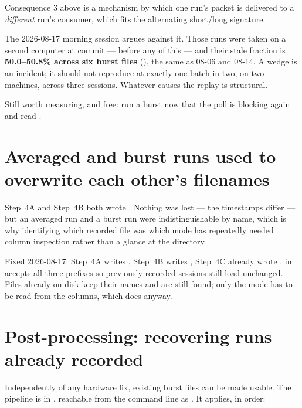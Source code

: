 \begin{openbox}[title=\textbf{Still open: does the wedge explain the burst replay? Probably not.}]
Consequence 3 above is a mechanism by which one run's packet is delivered to a
\emph{different} run's consumer, which fits the alternating short/long signature.

The 2026-08-17 morning session argues against it. Those runs were taken on a
second computer at commit  --- before any of this --- and their stale
fraction is \textbf{50.0--50.8\% across six burst files}
(), the same as 08-06 and 08-14. A wedge is an
incident; it should not reproduce at exactly one batch in two, on two machines,
across three sessions. Whatever causes the replay is structural.

Still worth measuring, and free: run a burst now that the poll is blocking again
and read .
\end{openbox}

\section{Averaged and burst runs used to overwrite each other's filenames}
\label{sec:namecollision}

Step~4A and Step~4B both wrote . Nothing was
lost --- the timestamps differ --- but an averaged run and a burst run were
indistinguishable by name, which is why identifying which recorded file was which
mode has repeatedly needed column inspection rather than a glance at the directory.

Fixed 2026-08-17: Step~4A writes , Step~4B writes
, Step~4C already wrote .
 in  accepts all three
prefixes so previously recorded sessions still load unchanged. Files already on disk
keep their  names and are still found; only the mode has to be read from
the columns, which  does anyway.


\section{Post-processing: recovering runs already recorded}
\label{sec:postproc}

Independently of any hardware fix, existing burst files can be made usable. The
pipeline is  in , reachable from
the command line as . It applies, in order:

